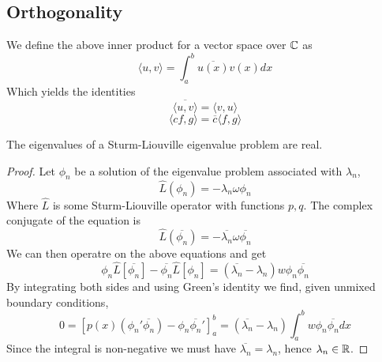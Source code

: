 \subsection{Orthogonality}
\begin{remark}
  We define the above inner product for a vector space over $\mathbb C$ as 
  \[\langle u,v \rangle =\int_a^b \overline{u(x)} v(x) dx\]
  Which yields the identities
  \[\overline{\langle u,v \rangle }=\langle v,u \rangle \]
  \[\langle cf,g \rangle =\overline{c}\langle f,g \rangle \]
\end{remark}
\begin{theorem}
  The eigenvalues of a Sturm-Liouville eigenvalue problem are real.
  \label{<+label+>}
\end{theorem}
\begin{proof}
  Let $\phi_n$ be a solution of the eigenvalue problem associated with $\lambda_n$,
  \[\hat{L}(\phi_n)=-\lambda_n\omega\phi_n\]
  Where $\hat{L}$ is some Sturm-Liouville operator with functions $p,q$. The complex
  conjugate of the equation is
  \[\hat{L}(\overline{\phi_n})=-\overline{\lambda_n}\omega\overline{\phi_n}\]
  We can then operatre on the above equations and get
  \[\phi_n\hat{L}[\overline{\phi_n}]-\overline{\phi_n}\hat{L}[\phi_n]=(\overline{\lambda_n}-\lambda_n)w
  \phi_n\overline{\phi_n}\]
  By integrating both sides and using Green's identity we find, given unmixed boundary
  conditions,
  \[0=[p(x)(\phi_n'\overline{\phi_n})- \phi_n\overline{\phi_n}']_a^b =
    (\overline{\lambda_n}-\lambda_n)\int_a^b w\phi_n\overline{\phi_n} dx\]
    Since the integral is non-negative we must have
    $\overline{\lambda_n}=\lambda_n$, hence $\lambda_n\in\mathbb R$.
\end{proof}
